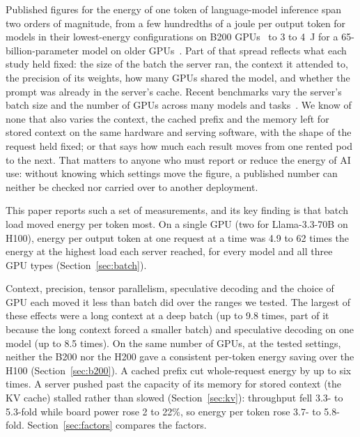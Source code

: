 \documentclass[11pt]{article}
\begin{document}
Published figures for the energy of one token of language-model inference span two orders of magnitude, from a few hundredths of a joule per output token for models in their lowest-energy configurations on B200 GPUs~\citep{chung2026joules} to 3 to 4~J for a 65-billion-parameter model on older GPUs~\citep{samsi2023words}. Part of that spread reflects what each study held fixed: the size of the batch the server ran, the context it attended to, the precision of its weights, how many GPUs shared the model, and whether the prompt was already in the server's cache. Recent benchmarks vary the server's batch size and the number of GPUs across many models and tasks~\citep{chung2026joules,chung2025mlenergy}. We know of none that also varies the context, the cached prefix and the memory left for stored context on the same hardware and serving software, with the shape of the request held fixed; or that says how much each result moves from one rented pod to the next. That matters to anyone who must report or reduce the energy of AI use: without knowing which settings move the figure, a published number can neither be checked nor carried over to another deployment.

This paper reports such a set of measurements, and its key finding is that batch load moved energy per token most. On a single GPU (two for Llama-3.3-70B on H100), energy per output token at one request at a time was 4.9 to 62 times the energy at the highest load each server reached, for every model and all three GPU types (Section~\ref{sec:batch}).

Context, precision, tensor parallelism, speculative decoding and the choice of GPU each moved it less than batch did over the ranges we tested. The largest of these effects were a long context at a deep batch (up to 9.8 times, part of it because the long context forced a smaller batch) and speculative decoding on one model (up to 8.5 times). On the same number of GPUs, at the tested settings, neither the B200 nor the H200 gave a consistent per-token energy saving over the H100 (Section~\ref{sec:b200}). A cached prefix cut whole-request energy by up to six times. A server pushed past the capacity of its memory for stored context (the KV cache) stalled rather than slowed (Section~\ref{sec:kv}): throughput fell 3.3- to 5.3-fold while board power rose 2 to 22\%, so energy per token rose 3.7- to 5.8-fold. Section~\ref{sec:factors} compares the factors.
\end{document}
